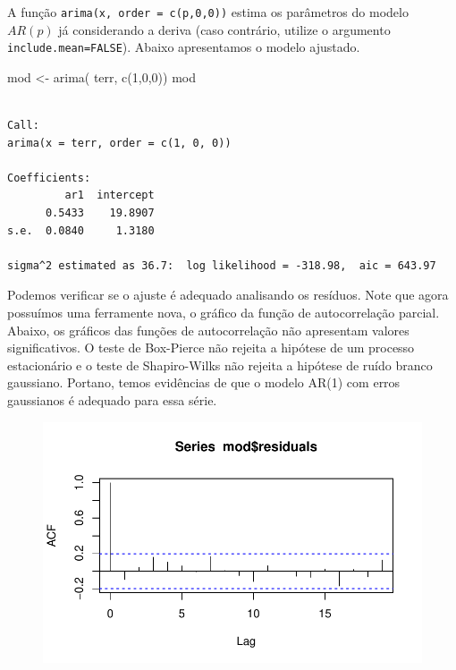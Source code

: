\documentclass[
  letterpaper,
  DIV=11,
  numbers=noendperiod]{scrartcl}
\newenvironment{Shaded}{\begin{snugshade}}{\end{snugshade}}
\newcommand{\DecValTok}[1]{\textcolor[rgb]{0.68,0.00,0.00}{#1}}
\newcommand{\FunctionTok}[1]{\textcolor[rgb]{0.28,0.35,0.67}{#1}}
\newcommand{\NormalTok}[1]{\textcolor[rgb]{0.00,0.23,0.31}{#1}}
\newcommand{\OtherTok}[1]{\textcolor[rgb]{0.00,0.23,0.31}{#1}}
\newcommand{\SpecialCharTok}[1]{\textcolor[rgb]{0.37,0.37,0.37}{#1}}
\theoremstyle{plain}
\theoremstyle{plain}
\theoremstyle{definition}
\theoremstyle{definition}
\theoremstyle{remark}
\begin{document}
A função \texttt{arima(x,\ order\ =\ c(p,0,0))} estima os parâmetros do
modelo \(AR(p)\) já considerando a deriva (caso contrário, utilize o
argumento \texttt{include.mean=FALSE}). Abaixo apresentamos o modelo
ajustado.

\begin{Shaded}
\begin{Highlighting}[]
\NormalTok{mod }\OtherTok{\textless{}{-}} \FunctionTok{arima}\NormalTok{( terr, }\FunctionTok{c}\NormalTok{(}\DecValTok{1}\NormalTok{,}\DecValTok{0}\NormalTok{,}\DecValTok{0}\NormalTok{))}
\NormalTok{mod}
\end{Highlighting}
\end{Shaded}

\begin{verbatim}

Call:
arima(x = terr, order = c(1, 0, 0))

Coefficients:
         ar1  intercept
      0.5433    19.8907
s.e.  0.0840     1.3180

sigma^2 estimated as 36.7:  log likelihood = -318.98,  aic = 643.97
\end{verbatim}

Podemos verificar se o ajuste é adequado analisando os resíduos. Note
que agora possuímos uma ferramente nova, o gráfico da função de
autocorrelação parcial. Abaixo, os gráficos das funções de
autocorrelação não apresentam valores significativos. O teste de
Box-Pierce não rejeita a hipótese de um processo estacionário e o teste
de Shapiro-Wilks não rejeita a hipótese de ruído branco gaussiano.
Portano, temos evidências de que o modelo AR(1) com erros gaussianos é
adequado para essa série.

\begin{Shaded}
\end{Shaded}

\begin{figure}[H]

{\centering \includegraphics{processo_linear_geral_files/figure-pdf/unnamed-chunk-7-1.pdf}

}

\end{figure}
\end{document}
